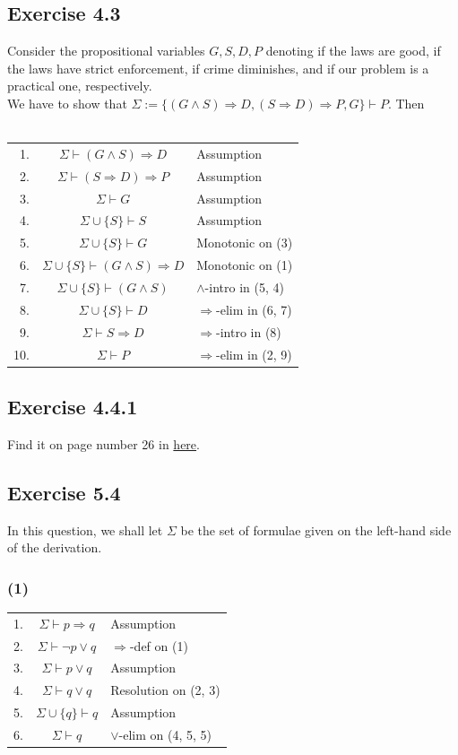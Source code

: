 \documentclass{article}
\begin{document}
\subsection*{Exercise 4.3}
Consider the propositional variables $G, S, D, P$ denoting if the laws are good, if the laws have strict enforcement, if crime diminishes, and if our problem is a practical one, respectively.\\
We have to show that $\Sigma := \{(G\wedge S)\Rightarrow D, (S\Rightarrow D)\Rightarrow P, G\}\vdash P$. Then \\
\\
\begin{tabular}{r c l}
    1. & $\Sigma\vdash (G\wedge S)\Rightarrow D$ & Assumption\\
    2. & $\Sigma\vdash (S\Rightarrow D)\Rightarrow P$ & Assumption\\
    3. & $\Sigma\vdash G$ & Assumption\\
    4. & $\Sigma\cup\{S\}\vdash S$ & Assumption\\
    5. & $\Sigma\cup\{S\}\vdash G$ & Monotonic on (3)\\
    6. & $\Sigma\cup\{S\}\vdash (G\wedge S)\Rightarrow D$ & Monotonic on (1)\\
    7. & $\Sigma\cup\{S\}\vdash (G\wedge S)$ & $\wedge$-intro in (5, 4)\\
    8. & $\Sigma\cup\{S\}\vdash D$ & $\Rightarrow$-elim in (6, 7)\\
    9. & $\Sigma\vdash S\Rightarrow D$ & $\Rightarrow$-intro in (8)\\
    10. & $\Sigma\vdash P$ & $\Rightarrow$-elim in (2, 9)\\
\end{tabular}
\subsection*{Exercise 4.4.1}
Find it on page number 26 in \href{https://www.cse.iitb.ac.in/~akg/courses/2022-logic/lec-04-formal.pdf}{here}.
\subsection*{Exercise 5.4} 
In this question, we shall let $\Sigma$ be the set of formulae given on the left-hand side of the derivation. 
\subsubsection*{(1)}
\begin{tabular}{r c l}
    1. & $\Sigma\vdash p\Rightarrow q$ & Assumption\\
    2. & $\Sigma\vdash \lnot p\lor q$ & $\Rightarrow$-def on (1)\\
    3. & $\Sigma\vdash p\lor q$ & Assumption\\
    4. & $\Sigma\vdash q\lor q$ & Resolution on (2, 3)\\
    5. & $\Sigma\cup\{q\}\vdash q$ & Assumption\\
    6. & $\Sigma\vdash q$ & $\lor$-elim on (4, 5, 5)\\
\end{tabular}
\end{document}
